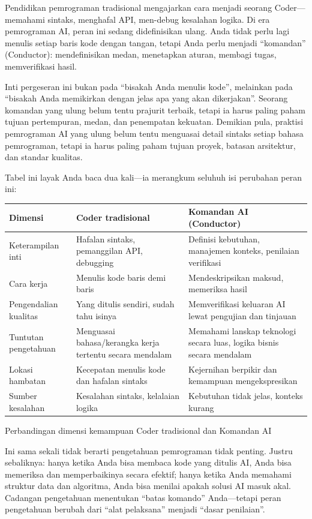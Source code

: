 
Pendidikan pemrograman tradisional mengajarkan cara menjadi seorang Coder—memahami sintaks, menghafal API, men-debug kesalahan logika. Di era pemrograman AI, peran ini sedang didefinisikan ulang. Anda tidak perlu lagi menulis setiap baris kode dengan tangan, tetapi Anda perlu menjadi “komandan” (Conductor): mendefinisikan medan, menetapkan aturan, membagi tugas, memverifikasi hasil.

Inti pergeseran ini bukan pada “bisakah Anda menulis kode”, melainkan pada “bisakah Anda memikirkan dengan jelas apa yang akan dikerjakan”. Seorang komandan yang ulung belum tentu prajurit terbaik, tetapi ia harus paling paham tujuan pertempuran, medan, dan penempatan kekuatan. Demikian pula, praktisi pemrograman AI yang ulung belum tentu menguasai detail sintaks setiap bahasa pemrograman, tetapi ia harus paling paham tujuan proyek, batasan arsitektur, dan standar kualitas.

Tabel ini layak Anda baca dua kali—ia merangkum seluhuh isi perubahan peran ini:

\begin{center}
\begin{tabularx}{\linewidth}{|X|X|X|}
\hline
\textbf{Dimensi} & \textbf{Coder tradisional} & \textbf{Komandan AI (Conductor)} \tabularnewline
\hline
Keterampilan inti & Hafalan sintaks, pemanggilan API, debugging & Definisi kebutuhan, manajemen konteks, penilaian verifikasi \tabularnewline
Cara kerja & Menulis kode baris demi baris & Mendeskripsikan maksud, memeriksa hasil \tabularnewline
Pengendalian kualitas & Yang ditulis sendiri, sudah tahu isinya & Memverifikasi keluaran AI lewat pengujian dan tinjauan \tabularnewline
Tuntutan pengetahuan & Menguasai bahasa/kerangka kerja tertentu secara mendalam & Memahami lanskap teknologi secara luas, logika bisnis secara mendalam \tabularnewline
Lokasi hambatan & Kecepatan menulis kode dan hafalan sintaks & Kejernihan berpikir dan kemampuan mengekspresikan \tabularnewline
Sumber kesalahan & Kesalahan sintaks, kelalaian logika & Kebutuhan tidak jelas, konteks kurang \tabularnewline
\hline
\end{tabularx}
\end{center}

\begin{center}\small\color{gray}Perbandingan dimensi kemampuan Coder tradisional dan Komandan AI\end{center}

Ini sama sekali tidak berarti pengetahuan pemrograman tidak penting. Justru sebaliknya: hanya ketika Anda bisa membaca kode yang ditulis AI, Anda bisa memeriksa dan memperbaikinya secara efektif; hanya ketika Anda memahami struktur data dan algoritma, Anda bisa menilai apakah solusi AI masuk akal. Cadangan pengetahuan menentukan “batas komando” Anda—tetapi peran pengetahuan berubah dari “alat pelaksana” menjadi “dasar penilaian”.

